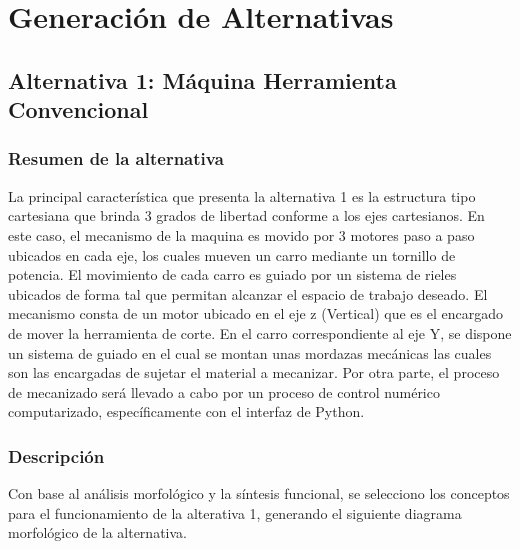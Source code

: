 \newpage
\section{Generación de Alternativas}

\subsection{Alternativa 1: Máquina Herramienta Convencional}

\subsubsection{Resumen de la alternativa} La principal característica que presenta la alternativa 1 es la estructura tipo cartesiana que brinda 3 grados de libertad conforme a los ejes cartesianos. En este caso, el mecanismo de la maquina es movido por 3 motores paso a paso ubicados en cada eje, los cuales mueven un carro mediante un tornillo de potencia. El movimiento de cada carro es guiado por un sistema de rieles ubicados de forma tal que permitan alcanzar el espacio de trabajo deseado. El mecanismo consta de un motor ubicado en el eje z (Vertical) que es el encargado de mover la herramienta de corte.
En el carro correspondiente al eje Y, se dispone un sistema de guiado en el cual se montan unas mordazas mecánicas las cuales son las encargadas de sujetar el material a mecanizar.
Por otra parte, el proceso de mecanizado será llevado a cabo por un proceso de control numérico computarizado, específicamente con el interfaz de Python.

\subsubsection{Descripción}
Con base al análisis morfológico y la síntesis funcional, se selecciono los conceptos para el funcionamiento de la alterativa 1, generando el siguiente diagrama morfológico de la alternativa. 


